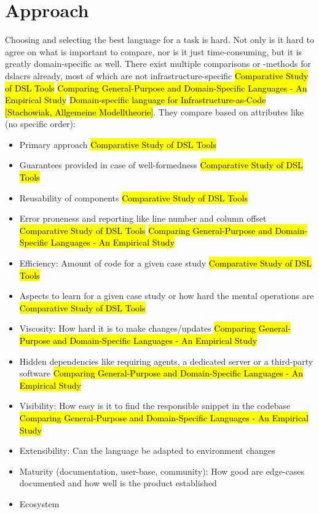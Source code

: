 \section{Approach}
Choosing and selecting the best language for a task is hard. Not only is it hard to agree on what is important to compare, nor is it just time-consuming, but it is greatly domain-specific as well.
There exist multiple comparisons or -methods for \gls{dslacr}s already, most of which are not infrastructure-specific \hl{Comparative Study of DSL Tools} \hl{Comparing General-Purpose and Domain-Specific Languages - An Empirical Study} \hl{Domain-specific language for Infrastructure-as-Code} \hl{[Stachowiak, Allgemeine Modelltheorie]}. %
They compare based on attributes like (no specific order):

\begin{itemize}
  \item Primary approach \hl{Comparative Study of DSL Tools}
  \item Guarantees provided in case of well-formedness \hl{Comparative Study of DSL Tools} %
  \item Reusability of components \hl{Comparative Study of DSL Tools}
  \item Error proneness and reporting like line number and column offset \hl{Comparative Study of DSL Tools} \hl{Comparing General-Purpose and Domain-Specific Languages - An Empirical Study}
  \item Efficiency: Amount of code for a given case study \hl{Comparative Study of DSL Tools}
  \item Aspects to learn for a given case study or how hard the mental operations are \hl{Comparative Study of DSL Tools} %
  \item Viscosity: How hard it is to make changes/updates \hl{Comparing General-Purpose and Domain-Specific Languages - An Empirical Study}
  \item Hidden dependencies like requiring agents, a dedicated server or a third-party software \hl{Comparing General-Purpose and Domain-Specific Languages - An Empirical Study}
  \item Visibility: How easy is it to find the responsible snippet in the codebase \hl{Comparing General-Purpose and Domain-Specific Languages - An Empirical Study}
  \item Extensibility: Can the language be adapted to environment changes
  \item Maturity (documentation, user-base, community): How good are edge-cases documented and how well is the product established
  \item Ecosystem
\end{itemize}

